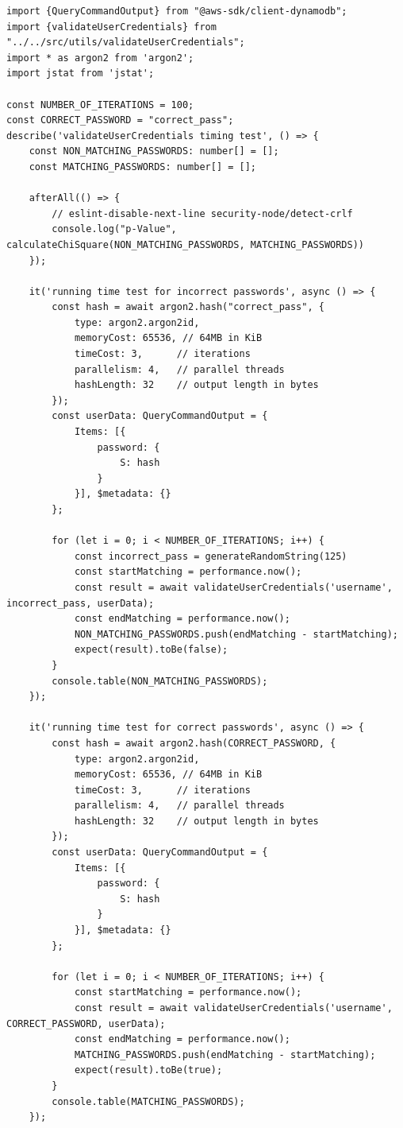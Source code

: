 \begin{lstlisting}[style=typescript,caption=Timing test for Hash Comparision,label=apendix:timing_test]
import {QueryCommandOutput} from "@aws-sdk/client-dynamodb";
import {validateUserCredentials} from "../../src/utils/validateUserCredentials";
import * as argon2 from 'argon2';
import jstat from 'jstat';

const NUMBER_OF_ITERATIONS = 100;
const CORRECT_PASSWORD = "correct_pass";
describe('validateUserCredentials timing test', () => {
    const NON_MATCHING_PASSWORDS: number[] = [];
    const MATCHING_PASSWORDS: number[] = [];

    afterAll(() => {
        // eslint-disable-next-line security-node/detect-crlf
        console.log("p-Value", calculateChiSquare(NON_MATCHING_PASSWORDS, MATCHING_PASSWORDS))
    });

    it('running time test for incorrect passwords', async () => {
        const hash = await argon2.hash("correct_pass", {
            type: argon2.argon2id,
            memoryCost: 65536, // 64MB in KiB
            timeCost: 3,      // iterations
            parallelism: 4,   // parallel threads
            hashLength: 32    // output length in bytes
        });
        const userData: QueryCommandOutput = {
            Items: [{
                password: {
                    S: hash
                }
            }], $metadata: {}
        };

        for (let i = 0; i < NUMBER_OF_ITERATIONS; i++) {
            const incorrect_pass = generateRandomString(125)
            const startMatching = performance.now();
            const result = await validateUserCredentials('username', incorrect_pass, userData);
            const endMatching = performance.now();
            NON_MATCHING_PASSWORDS.push(endMatching - startMatching);
            expect(result).toBe(false);
        }
        console.table(NON_MATCHING_PASSWORDS);
    });

    it('running time test for correct passwords', async () => {
        const hash = await argon2.hash(CORRECT_PASSWORD, {
            type: argon2.argon2id,
            memoryCost: 65536, // 64MB in KiB
            timeCost: 3,      // iterations
            parallelism: 4,   // parallel threads
            hashLength: 32    // output length in bytes
        });
        const userData: QueryCommandOutput = {
            Items: [{
                password: {
                    S: hash
                }
            }], $metadata: {}
        };

        for (let i = 0; i < NUMBER_OF_ITERATIONS; i++) {
            const startMatching = performance.now();
            const result = await validateUserCredentials('username', CORRECT_PASSWORD, userData);
            const endMatching = performance.now();
            MATCHING_PASSWORDS.push(endMatching - startMatching);
            expect(result).toBe(true);
        }
        console.table(MATCHING_PASSWORDS);
    });


\end{lstlisting}
